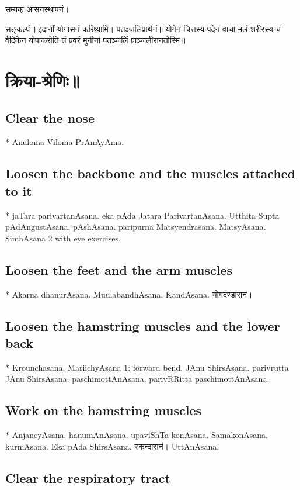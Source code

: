 \documentclass[oneside, article]{memoir}
\begin{document}
सम्यक् आसनस्थापनं।

सङ्कल्पं॥ इदानीं योगासनं करिष्यामि।
पतञ्जलिप्रार्थनं॥ योगेन चित्तस्य पदेन वाचां मलं शरीरस्य च वैदिकेन योपाकरोति तं प्रवरं मुनीनां पतञ्जलिं प्राञ्जलीरानतोस्मि॥

\section{क्रिया-श्रेणिः॥}
\subsection{Clear the nose}

    * Anuloma Viloma PrAnAyAma.

\subsection{Loosen the backbone and the muscles attached to it}

    * jaTara parivartanAsana. eka pAda Jatara ParivartanAsana. Utthita Supta pAdAngustAsana. pAshAsana. paripurna Matsyendrasana. MatsyAsana. SimhAsana 2 with eye exercises.

\subsection{Loosen the feet and the arm muscles}

    * Akarna dhanurAsana. MuulabandhAsana. KandAsana. योगदण्डासनं।

\subsection{Loosen the hamstring muscles and the lower back}

    * Krounchasana. MariichyAsana 1: forward bend. JAnu ShirsAsana. parivrutta JAnu ShirsAsana. paschimottAnAsana, parivRRitta paschimottAnAsana.

\subsection{Work on the hamstring muscles}

    * AnjaneyAsana. hanumAnAsana. upaviShTa konAsana. SamakonAsana. kurmAsana. Eka pAda ShirsAsana. स्कन्दासनं। UttAnAsana.

\subsection{Clear the respiratory tract}
\end{document}
